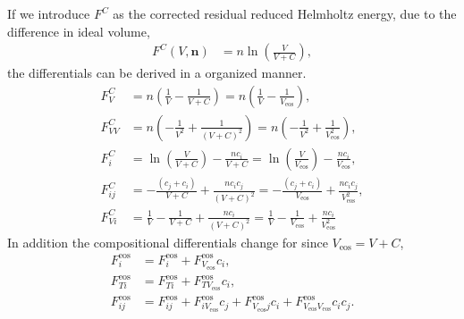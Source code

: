 \documentclass[english]{../thermomemo/thermomemo}
\newcommand*{\vektor}[1]{\boldsymbol{#1}}%
\begin{document}
If we introduce $F^C$ as the corrected residual reduced Helmholtz energy, due to
the difference in ideal volume,
\begin{align}
  F^C(V,\vektor{n}) &= n \ln \left(\frac{V}{V+C} \right),
  \label{eq:F_corr}
\end{align}
the differentials can be derived in a organized manner.
\begin{align}
  F^C_{V} &= n \left(\frac{1}{V} - \frac{1}{V+C} \right) = n \left(\frac{1}{V} - \frac{1}{V_{\text{eos}}} \right), \\
  F^C_{VV} &= n \left(-\frac{1}{V^2} + \frac{1}{\left(V+C\right)^2} \right) = n \left(-\frac{1}{V^2} + \frac{1}{V_{\text{eos}}^2} \right), \\
  F^C_{i} &= \ln \left(\frac{V}{V+C} \right) - \frac{nc_i}{V+C} = \ln \left(\frac{V}{V_{\text{eos}}} \right) - \frac{nc_i}{V_{\text{eos}}}, \\
  F^C_{ij} &= -\frac{\left(c_j + c_i \right)}{V+C} +  \frac{n c_ic_j}{\left(V+C\right)^2} = -\frac{\left(c_j + c_i \right)}{V_{\text{eos}}} +  \frac{n c_ic_j}{V_{\text{eos}}^2}, \\
  F^C_{Vi} &= \frac{1}{V} - \frac{1}{V+C} + \frac{nc_i}{\left(V+C\right)^2} =  \frac{1}{V} - \frac{1}{V_{\text{eos}}} + \frac{nc_i}{V_{\text{eos}}^2}
\end{align}
In addition the compositional differentials change for since $V_{\text{eos}} = V + C$,
\begin{align}
  F^{\text{eos}}_{i} &= F^{\text{eos}}_{i} + F^{\text{eos}}_{V_{\text{eos}}} c_i , \\
  F^{\text{eos}}_{Ti} &= F^{\text{eos}}_{Ti} + F^{\text{eos}}_{TV_{\text{eos}}} c_i , \\
  F^{\text{eos}}_{ij} &= F^{\text{eos}}_{ij} + F^{\text{eos}}_{iV_{\text{eos}}} c_j + F^{\text{eos}}_{V_{\text{eos}}j} c_i + F^{\text{eos}}_{V_{\text{eos}}V_{\text{eos}}} c_ic_j .
\end{align}
\end{document}
